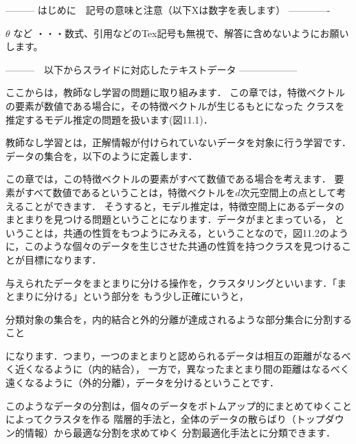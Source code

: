 --------- はじめに　記号の意味と注意（以下Xは数字を表します） -------------

$\theta$ など       ・・・数式、引用などのTex記号も無視で、解答に含めないようにお願いします。
\cite{mitchell97}

---------　以下からスライドに対応したテキストデータ ------------------



ここからは，教師なし学習の問題に取り組みます．
この章では，特徴ベクトルの要素が数値である場合に，その特徴ベクトルが生じるもとになった
クラスを推定するモデル推定の問題を扱います(図11.1)．


教師なし学習とは，正解情報が付けられていないデータを対象に行う学習です．
データの集合を，以下のように定義します．

この章では，この特徴ベクトルの要素がすべて数値である場合を考えます．
要素がすべて数値であるということは，特徴ベクトルを$d$次元空間上の点として考えることができます．
そうすると，モデル推定は，特徴空間上にあるデータのまとまりを見つける問題ということになります．データがまとまっている，
ということは，共通の性質をもつようにみえる，ということなので，図11.2のように，このような個々のデータを生じさせた共通の性質を持つクラスを見つけることが目標になります．


与えられたデータをまとまりに分ける操作を，クラスタリングといいます．「まとまりに分ける」という部分を
もう少し正確にいうと，

分類対象の集合を，内的結合と外的分離が達成されるような部分集合に分割すること

になります．つまり，一つのまとまりと認められるデータは相互の距離がなるべく近くなるように（内的結合），
一方で，異なったまとまり間の距離はなるべく遠くなるように（外的分離），データを分けるということです．

このようなデータの分割は，個々のデータをボトムアップ的にまとめてゆくことによってクラスタを作る
階層的手法と，全体のデータの散らばり（トップダウン的情報）から最適な分割を求めてゆく
分割最適化手法とに分類できます．

